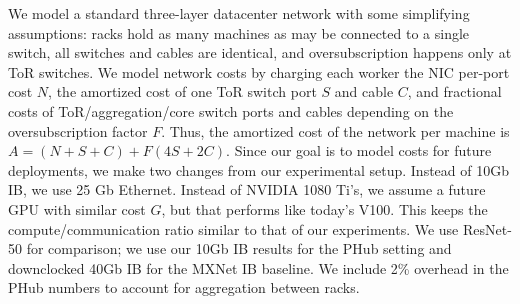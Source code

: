 We model a standard three-layer datacenter network with some simplifying assumptions: racks hold as many machines as may be connected to a single switch, all switches and cables are identical, and oversubscription happens only at ToR switches. We model network costs by charging each worker the NIC per-port cost $N$, the amortized cost of one ToR switch port $S$ and cable $C$, and fractional costs of ToR/aggregation/core switch ports and cables depending on the oversubscription factor $F$. Thus, the amortized cost of the network per machine is $A=(N+S+C)+F(4S+2C)$. Since our goal is to model costs for future deployments, we make two changes from our experimental setup. Instead of 10Gb IB, we use 25 Gb Ethernet. Instead of NVIDIA 1080 Ti's, we assume a future GPU with similar cost $G$, but that performs like today's V100. This keeps the compute/communication ratio similar to that of our experiments. We use ResNet-50 for comparison; we use our 10Gb IB results for the PHub setting and downclocked 40Gb IB for the MXNet IB baseline. We include 2\% overhead in the PHub numbers to account for aggregation between racks.



